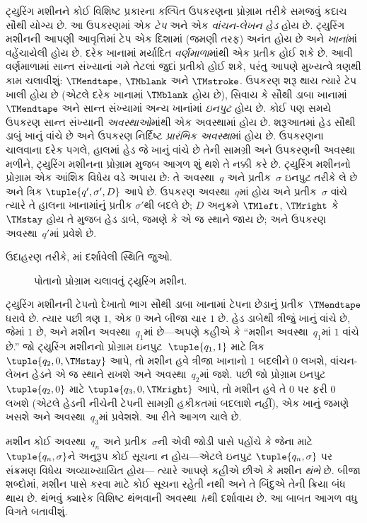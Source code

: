 \begin{explain}
ટ્યુરિંગ મશીનને કોઈ વિશિષ્ટ પ્રકારના કલ્પિત ઉપકરણના પ્રોગ્રામ
તરીકે સમજવું કદાચ સૌથી યોગ્ય છે. આ ઉપકરણમાં એક \emph{ટેપ} અને
એક \emph{વાંચન-લેખન હેડ} હોય છે. ટ્યુરિંગ મશીનની આપણી આવૃત્તિમાં
ટેપ એક દિશામાં (જમણી તરફ) અનંત હોય છે અને \emph{ખાનાં}માં
વહેંચાયેલી હોય છે. દરેક ખાનામાં મર્યાદિત \emph{વર્ણમાળા}માંથી
એક પ્રતીક હોઈ શકે છે. આવી વર્ણમાળામાં સાન્ત સંખ્યાનાં ગમે તેટલાં જુદાં પ્રતીકો
હોઈ શકે, પરંતુ આપણે મુખ્યત્વે ત્રણથી કામ ચલાવીશું:
$\TMendtape$, $\TMblank$ અને $\TMstroke$. ઉપકરણ શરૂ થાય ત્યારે
ટેપ ખાલી હોય છે (એટલે દરેક ખાનામાં $\TMblank$ હોય છે), સિવાય કે
સૌથી ડાબા ખાનામાં $\TMendtape$ અને સાન્ત સંખ્યામાં અન્ય ખાનાંમાં
\emph{ઇનપુટ} હોય છે. કોઈ પણ સમયે ઉપકરણ સાન્ત સંખ્યાની
\emph{અવસ્થાઓ}માંથી એક અવસ્થામાં હોય છે. શરૂઆતમાં હેડ સૌથી
ડાબું ખાનું વાંચે છે અને ઉપકરણ નિર્દિષ્ટ \emph{પ્રારંભિક અવસ્થા}માં
હોય છે. ઉપકરણના ચાલવાના દરેક પગલે, હાલમાં હેડ જે ખાનું વાંચે
છે તેની સામગ્રી અને ઉપકરણની અવસ્થા મળીને, ટ્યુરિંગ મશીનના
પ્રોગ્રામ મુજબ આગળ શું થશે તે નક્કી કરે છે. ટ્યુરિંગ મશીનનો
પ્રોગ્રામ એક આંશિક વિધેય વડે અપાય છે: તે અવસ્થા~$q$ અને
પ્રતીક~$\sigma$ ઇનપુટ તરીકે લે છે અને ત્રિક
$\tuple{q', \sigma', D}$ આપે છે. ઉપકરણ અવસ્થા~$q$માં હોય અને
પ્રતીક~$\sigma$ વાંચે ત્યારે તે હાલના ખાનામાંનું પ્રતીક
$\sigma'$થી બદલે છે; $D$ અનુક્રમે $\TMleft$, $\TMright$ કે
$\TMstay$ હોય તે મુજબ હેડ ડાબે, જમણે કે એ જ સ્થાને જાય છે;
અને ઉપકરણ અવસ્થા~$q'$માં પ્રવેશે છે.

ઉદાહરણ તરીકે, માં દર્શાવેલી સ્થિતિ જુઓ.
\begin{figure}
  \caption{પોતાનો પ્રોગ્રામ ચલાવતું ટ્યુરિંગ મશીન.}
\end{figure}
ટ્યુરિંગ મશીનની ટેપનો દેખાતો ભાગ સૌથી ડાબા ખાનામાં ટેપના
છેડાનું પ્રતીક~$\TMendtape$ ધરાવે છે. ત્યાર પછી ત્રણ $1$,
એક $0$ અને બીજા ચાર $1$ છે. હેડ ડાબેથી ત્રીજું ખાનું વાંચે
છે, જેમાં $1$ છે, અને મશીન અવસ્થા~$q_1$માં છે---અપણે કહીએ
કે ``મશીન અવસ્થા~$q_1$માં $1$ વાંચે છે.'' જો ટ્યુરિંગ મશીનનો
પ્રોગ્રામ ઇનપુટ~$\tuple{q_1, 1}$ માટે ત્રિક
$\tuple{q_2, 0, \TMstay}$ આપે, તો મશીન હવે ત્રીજા ખાનાનો
$1$ બદલીને $0$ લખશે, વાંચન-લેખન હેડને એ જ સ્થાને રાખશે અને
અવસ્થા~$q_2$માં જશે. પછી જો પ્રોગ્રામ ઇનપુટ~$\tuple{q_2, 0}$
માટે $\tuple{q_3, 0, \TMright}$ આપે, તો મશીન હવે તે $0$ પર
ફરી $0$ લખશે (એટલે હેડની નીચેની ટેપની સામગ્રી હકીકતમાં
બદલાશે નહીં), એક ખાનું જમણે ખસશે અને અવસ્થા~$q_3$માં
પ્રવેશશે. આ રીતે આગળ ચાલે છે.

મશીન કોઈ અવસ્થા~$q_n$ અને પ્રતીક~$\sigma$ની એવી જોડી પાસે
પહોંચે કે જેના માટે $\tuple{q_n, \sigma}$ને અનુરૂપ કોઈ સૂચના
ન હોય---એટલે ઇનપુટ $\tuple{q_n,\sigma}$ પર સંક્રમણ વિધેય
અવ્યાખ્યાયિત હોય---
ત્યારે આપણે કહીએ છીએ કે મશીન \emph{થંભે} છે. બીજા શબ્દોમાં,
મશીન પાસે કરવા માટે કોઈ સૂચના રહેતી નથી અને તે બિંદુએ તેની
ક્રિયા બંધ થાય છે. થંભવું ક્યારેક વિશિષ્ટ થંભવાની
અવસ્થા~$h$થી દર્શાવાય છે. આ બાબત આગળ વધુ વિગતે બતાવીશું.
\end{explain}

